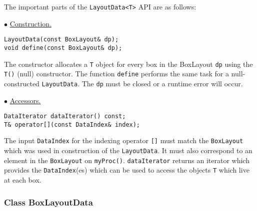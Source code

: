 \noindent
The important parts of the \verb/LayoutData<T>/ API are as follows:
\begin{trivlist} 
\item $\bullet$ \underline{Construction.}
\begin{verbatim}        
LayoutData(const BoxLayout& dp);
void define(const BoxLayout& dp);
\end{verbatim}
The constructor allocates a \verb/T/ object for every box in the
BoxLayout {\tt dp}
using the \verb/T()/ (null) constructor. 
The function {\tt define} performs the
same task for a null-constructed {\tt LayoutData}.
The  \verb/dp/ must be closed
or a runtime error will occur.

\item $\bullet$ \underline{Accessors.}
\begin{verbatim}        
DataIterator dataIterator() const;
T& operator[](const DataIndex& index);
\end{verbatim}
The input {\tt DataIndex} for the indexing operator {\tt []} must match the
{\tt BoxLayout} which was used in construction of the {\tt LayoutData}. It must
also correspond to an element in the {\tt BoxLayout} on 
{\tt myProc()}. {\tt dataIterator} returns an
iterator which provides the {\tt DataIndex}(es) which
can be used to access the objects {\tt T} which live at each box.

\end{trivlist}

\subsubsection{Class BoxLayoutData}
\label{BoxLayoutDataSection}

